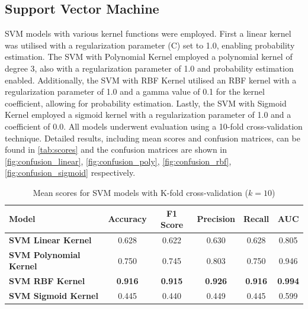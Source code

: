 \subsection*{Support Vector Machine}
\gls{SVM} models with various kernel functions were employed. First a linear kernel was utilised with a regularization parameter (C) set to 1.0, enabling probability estimation. The SVM with Polynomial Kernel employed a polynomial kernel of degree 3, also with a regularization parameter of 1.0 and probability estimation enabled. Additionally, the SVM with \gls{RBF} Kernel utilised an RBF kernel with a regularization parameter of 1.0 and a gamma value of 0.1 for the kernel coefficient, allowing for probability estimation. Lastly, the SVM with Sigmoid Kernel employed a sigmoid kernel with a regularization parameter of 1.0 and a coefficient of 0.0. All models underwent evaluation using a 10-fold cross-validation technique. Detailed results, including mean scores and confusion matrices, can be found in \autoref{tab:scores} and the confusion matrices are shown in \autoref{fig:confusion_linear}, \autoref{fig:confusion_poly}, \autoref{fig:confusion_rbf}, \autoref{fig:confusion_sigmoid} respectively.

\begin{table}[hhtbp]
    \centering
    \begin{tabular}{|p{5cm}|c|c|c|c|c|}
    \hline
    \textbf{Model} & \textbf{Accuracy} & \textbf{F1 Score} & \textbf{Precision} & \textbf{Recall} & \textbf{AUC} \\ \hline
    \textbf{SVM Linear Kernel} & 0.628 & 0.622 & 0.630 & 0.628 & 0.805 \\
    \textbf{SVM Polynomial Kernel } & 0.750 & 0.745 & 0.803 & 0.750 & 0.946 \\
    \textbf{SVM RBF Kernel} & \textbf{0.916} & \textbf{0.915} & \textbf{0.926} & \textbf{0.916} & \textbf{0.994} \\
    \textbf{SVM Sigmoid Kernel} & 0.445 & 0.440 & 0.449 & 0.445 & 0.599 \\ \hline
    \end{tabular}
    \caption{Mean scores for SVM models with K-fold cross-validation ($k=10$)}
    \label{tab:scores}
    \end{table}


